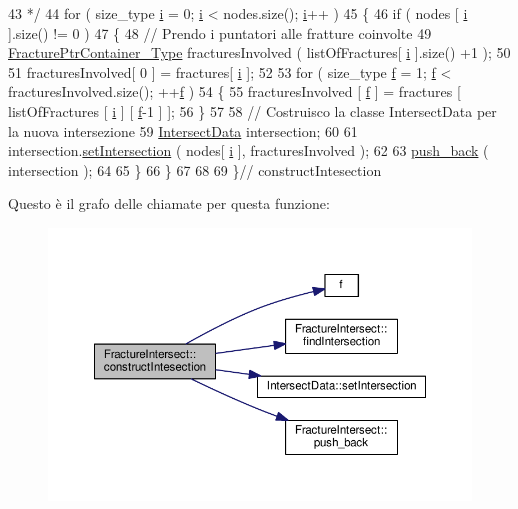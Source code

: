 \begin{DoxyCode}
43 \textcolor{comment}{     */}
44     \textcolor{keywordflow}{for} ( size\_type \hyperlink{god__e_8m_a8604be5925f4266ab5ccc69675329c80}{i} = 0; \hyperlink{god__e_8m_a8604be5925f4266ab5ccc69675329c80}{i} < nodes.size(); \hyperlink{god__e_8m_a8604be5925f4266ab5ccc69675329c80}{i}++ )
45     \{
46         \textcolor{keywordflow}{if} ( nodes [ \hyperlink{god__e_8m_a8604be5925f4266ab5ccc69675329c80}{i} ].size() != 0 )
47         \{
48             \textcolor{comment}{// Prendo i puntatori alle fratture coinvolte}
49             \hyperlink{FractureHandler_8h_a2f0b57e18ecf89912d7de0c87158009e}{FracturePtrContainer\_Type} fracturesInvolved ( listOfFractures[ 
      \hyperlink{god__e_8m_a8604be5925f4266ab5ccc69675329c80}{i} ].size() +1 );
50 
51             fracturesInvolved[ 0 ] = fractures[ \hyperlink{god__e_8m_a8604be5925f4266ab5ccc69675329c80}{i} ];
52 
53             \textcolor{keywordflow}{for} ( size\_type \hyperlink{god__e_8m_a68f477f9b30a6300d5af9b02eac82f35}{f} = 1; \hyperlink{god__e_8m_a68f477f9b30a6300d5af9b02eac82f35}{f} < fracturesInvolved.size(); ++\hyperlink{god__e_8m_a68f477f9b30a6300d5af9b02eac82f35}{f} )
54             \{
55                  fracturesInvolved [ \hyperlink{god__e_8m_a68f477f9b30a6300d5af9b02eac82f35}{f} ] = fractures [ listOfFractures [ \hyperlink{god__e_8m_a8604be5925f4266ab5ccc69675329c80}{i} ] [ 
      \hyperlink{god__e_8m_a68f477f9b30a6300d5af9b02eac82f35}{f}-1 ] ];
56             \}
57 
58             \textcolor{comment}{// Costruisco la classe IntersectData per la nuova intersezione}
59             \hyperlink{classIntersectData}{IntersectData} intersection;
60 
61             intersection.\hyperlink{classIntersectData_a4dbe681fa68704c9e2bf3f8e290b55f7}{setIntersection} ( nodes[ \hyperlink{god__e_8m_a8604be5925f4266ab5ccc69675329c80}{i} ], fracturesInvolved );
62 
63             \hyperlink{classFractureIntersect_a01bc187a846208a47a13daeeb94b13f5}{push\_back} ( intersection );
64 
65         \}
66     \}
67 
68 
69 \}\textcolor{comment}{// constructIntesection}
\end{DoxyCode}


Questo è il grafo delle chiamate per questa funzione\-:
\nopagebreak
\begin{figure}[H]
\begin{center}
\leavevmode
\includegraphics[width=350pt]{classFractureIntersect_a192d02d60bcab84e6ab2765c8167f614_cgraph}
\end{center}
\end{figure}



